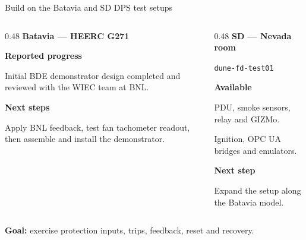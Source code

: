 \documentclass[aspectratio=169,11pt]{beamer}
\newcommand{\captionline}[1]{\par{\footnotesize\color{DuneTextMuted}#1\par}}
\begin{document}
\begin{frame}{Build on the Batavia and SD DPS test setups}
\begin{columns}[T,onlytextwidth]
\begin{column}{0.48\textwidth}
\textbf{Batavia --- HEERC G271}\par\bigskip
\textbf{Reported progress}\par\medskip
Initial BDE demonstrator design completed and reviewed with the WIEC team at BNL.\par\bigskip
\textbf{Next steps}\par\medskip
Apply BNL feedback, test fan tachometer readout, then assemble and install the demonstrator.
\end{column}
\begin{column}{0.48\textwidth}
\textbf{SD --- Nevada room}\par\medskip
\texttt{dune-fd-test01}\par\medskip
\textbf{Available}\par\medskip
PDU, smoke sensors, relay and GIZMo.\par\medskip
Ignition, OPC UA bridges and emulators.\par\bigskip
\textbf{Next step}\par\medskip
Expand the setup along the Batavia model.
\end{column}
\end{columns}\par\bigskip
\textbf{Goal:} exercise protection inputs, trips, feedback, reset and recovery.\par\medskip
\end{frame}

\DpsDetectorTransition
\end{document}
